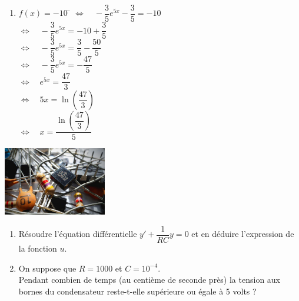\documentclass[a4paper,11pt,exos]{nsi} %
\begin{document}
{\begin{enumerate}
        $\lim\limits_{x\to -\infty}f(x)=\lim\limits_{x\to -\infty}-\dfrac{3}{5}e^{5x}- \dfrac{3}{5}=« -\dfrac{3}{5}\times 0- \dfrac{3}{5}»=- \dfrac{3}{5}$.
        \item \begin{tabbing}
            $f(x)=-10$ \= $\iff \quad -\dfrac{3}{5}e^{5x}- \dfrac{3}{5}=-10$\\[.5em]
            \> $\iff \quad -\dfrac{3}{5}e^{5x}=-10+\dfrac{3}{5}$\\[.5em]
            \> $\iff \quad -\dfrac{3}{5}e^{5x}=\dfrac{3}{5}-\dfrac{50}{5}$\\[.5em]
            \> $\iff \quad -\dfrac{3}{5}e^{5x}=-\dfrac{47}{5}$\\[.5em]
            \> $\iff \quad e^{5x}=\dfrac{47}{3}$\\[.5em]
            \> $\iff \quad 5x=\ln\left(\dfrac{47}{3}\right)$\\[.5em]
            \> $\iff \quad x=\dfrac{\ln\left(\dfrac{47}{3}\right)}{5}$
        \end{tabbing}
    \end{enumerate}
}

{\includegraphics[width=4.5cm]{capacitor-1835729_640.jpg}}
\begin{enumerate}
    \item Résoudre l'équation différentielle $y'+\dfrac{1}{RC}y=0$ et en déduire l'expression de la fonction $u$.
    \item On suppose que $R=1000$ et $C=10^{-4}$.\\
    Pendant combien de temps (au centième de seconde près) la tension aux bornes du condensateur reste-t-elle supérieure ou égale à 5 volts ?
\end{enumerate}
\end{document}
